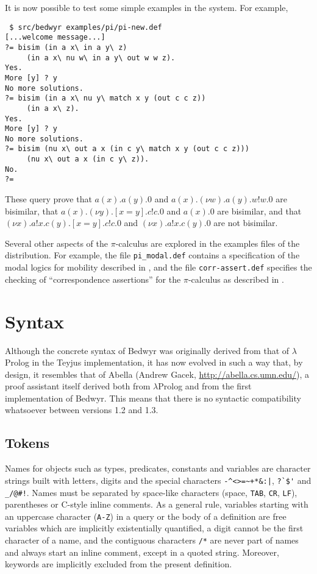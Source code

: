 \documentclass{article}
\newcommand{\lp}{$\lambda$Prolog}
\begin{document}
It is now possible to test some simple examples in the system.  For
example,
\begin{verbatim}
 $ src/bedwyr examples/pi/pi-new.def
[...welcome message...]
?= bisim (in a x\ in a y\ z)
     (in a x\ nu w\ in a y\ out w w z).
Yes.
More [y] ? y
No more solutions.
?= bisim (in a x\ nu y\ match x y (out c c z))
     (in a x\ z).
Yes.
More [y] ? y
No more solutions.
?= bisim (nu x\ out a x (in c y\ match x y (out c c z)))
     (nu x\ out a x (in c y\ z)).
No.
?=
\end{verbatim}
These query prove that
$a(x).a(y).0$ and $a(x).(\nu w).a(y).w!w.0$ are bisimilar,
that
$a(x).(\nu y).[x=y].c!c.0$ and $a(x).0$ are bisimilar, and that
$(\nu x).a!x.c(y).[x=y].c!c.0$ and
$(\nu x).a!x.c(y).0$ are not bisimilar.

Several other aspects of the $\pi$-calculus are explored in the examples
files of the distribution.  For example, the file \verb+pi_modal.def+
contains a specification of the modal logics for mobility described in
\cite{milner93tcs}, and the file \verb+corr-assert.def+ specifies the
checking of ``correspondence assertions'' for the $\pi$-calculus as
described in \cite{gordon03tcs}.


\appendix

\section{Syntax}

Although the concrete syntax of Bedwyr was originally derived from that
of \lp{} in the Teyjus implementation\cite{nadathur99cade}, it has
now evolved in such a way that, by design, it resembles that of Abella
(Andrew Gacek,
\urldef{\thisurl}\url{http://abella.cs.umn.edu/}\ahrefurl{\thisurl}), a
proof assistant itself derived both from \lp{} and from the first
implementation of Bedwyr. This means that there is no syntactic
compatibility whatsoever between versions 1.2 and 1.3.

\subsection{Tokens}

Names for objects such as types, predicates, constants and variables are
character strings built with letters, digits and the special characters
\verb.-^<>=~+*&:|., \verb.?`$'. and \verb._/@#!.. Names must be
separated by space-like characters (space, \verb.TAB., \verb.CR.,
\verb.LF.), parentheses or C-style inline comments. As a general rule,
variables starting with an uppercase character (\verb.A-Z.) in a query
or the body of a definition are free variables which are implicitly
existentially quantified, a digit cannot be the first character of a
name, and the contiguous characters \verb./*. are never part of names
and always start an inline comment, except in a quoted string. Moreover,
keywords are implicitly excluded from the present definition.
\end{document}
